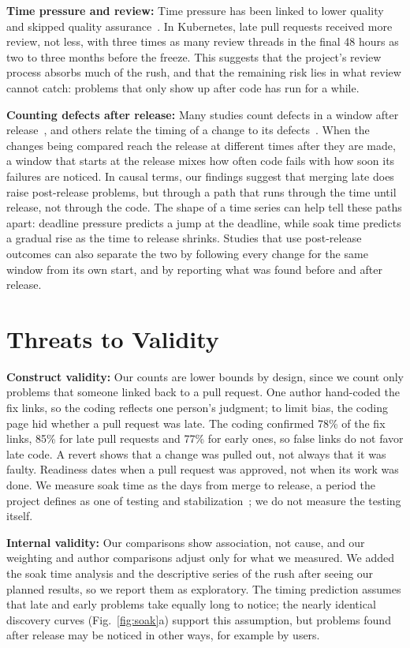 \documentclass[10pt,conference]{IEEEtran}
\begin{document}
\textbf{Time pressure and review:} Time pressure has been linked to lower quality and skipped quality assurance~\cite{kuutila2020time}. In Kubernetes, late pull requests received more review, not less, with three times as many review threads in the final 48 hours as two to three months before the freeze. This suggests that the project's review process absorbs much of the rush, and that the remaining risk lies in what review cannot catch: problems that only show up after code has run for a while.

\textbf{Counting defects after release:} Many studies count defects in a window after release~\cite{zimmermann2007predicting}, and others relate the timing of a change to its defects~\cite{sliwerski2005fridays,eyolfson2011time}. When the changes being compared reach the release at different times after they are made, a window that starts at the release mixes how often code fails with how soon its failures are noticed. In causal terms, our findings suggest that merging late does raise post-release problems, but through a path that runs through the time until release, not through the code. The shape of a time series can help tell these paths apart: deadline pressure predicts a jump at the deadline, while soak time predicts a gradual rise as the time to release shrinks. Studies that use post-release outcomes can also separate the two by following every change for the same window from its own start, and by reporting what was found before and after release.

\section{Threats to Validity}

\textbf{Construct validity:} Our counts are lower bounds by design, since we count only problems that someone linked back to a pull request. One author hand-coded the fix links, so the coding reflects one person's judgment; to limit bias, the coding page hid whether a pull request was late. The coding confirmed 78\% of the fix links, 85\% for late pull requests and 77\% for early ones, so false links do not favor late code. A revert shows that a change was pulled out, not always that it was faulty. Readiness dates when a pull request was approved, not when its work was done. We measure soak time as the days from merge to release, a period the project defines as one of testing and stabilization~\cite{k8scycle,k8sphases}; we do not measure the testing itself.

\textbf{Internal validity:} Our comparisons show association, not cause, and our weighting and author comparisons adjust only for what we measured. We added the soak time analysis and the descriptive series of the rush after seeing our planned results, so we report them as exploratory. The timing prediction assumes that late and early problems take equally long to notice; the nearly identical discovery curves (Fig.~\ref{fig:soak}a) support this assumption, but problems found after release may be noticed in other ways, for example by users.
\end{document}
